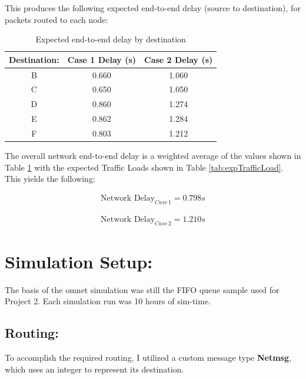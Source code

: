 \documentclass{article}
\begin{document}
This produces the following expected end-to-end delay (source to destination), for packets routed to each node:

\begin{table}[h!]
\centering
\begin{tabular}{|c|c|c|} \hline
\textbf{Destination:} & \textbf{Case 1 Delay (s)} & \textbf{Case 2 Delay (s)} \\ \hline
B & 0.660 & 1.060 \\ \hline
C & 0.650 & 1.050 \\ \hline
D & 0.860 & 1.274 \\ \hline
E & 0.862 & 1.284 \\ \hline
F & 0.803 & 1.212 \\ \hline
\end{tabular}
\caption{Expected end-to-end delay by destination}
\label{tab:expEndDelay}
\end{table}

The overall network end-to-end delay is a weighted average of the values shown in Table \ref{tab:expEndDelay} with the expected Traffic Loads shown in Table \ref{tab:expTrafficLoad}.
This yields the following:
\newline

\begin{minipage}{0.5\textwidth}
\begin{align*}
\text{Network Delay}_{Case \, 1} = 0.798s
\end{align*}
\end{minipage}
\begin{minipage}{0.5\textwidth}
\begin{align*}
\text{Network Delay}_{Case \, 2} = 1.210s
\end{align*}
\end{minipage}
\newline 

\section{Simulation Setup:}
\label{sec:SimSetup}

The basis of the omnet simulation was still the FIFO queue sample used for Project 2.
Each simulation run was 10 hours of sim-time.

\subsection{Routing:}
\label{subsec:RoutingSetup}
To accomplish the required routing, I utilized a custom message type \textbf{Netmsg}, which uses an integer to represent its destination.
\end{document}
